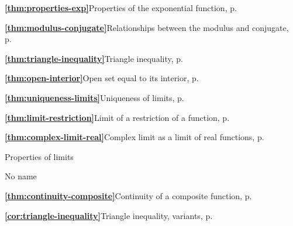 \textbf{\ref{thm:properties-exp}}\quad Properties of the exponential function, p.~\pageref{thm:properties-exp}

\textbf{\ref{thm:modulus-conjugate}}\quad Relationships between the modulus and conjugate, p.~\pageref{thm:modulus-conjugate}

\textbf{\ref{thm:triangle-inequality}}\quad Triangle inequality, p.~\pageref{thm:triangle-inequality}

\textbf{\ref{thm:open-interior}}\quad Open set equal to its interior, p.~\pageref{thm:open-interior}

\textbf{\ref{thm:uniqueness-limits}}\quad Uniqueness of limits, p.~\pageref{thm:uniqueness-limits}

\textbf{\ref{thm:limit-restriction}}\quad Limit of a restriction of a function, p.~\pageref{thm:limit-restriction}

\textbf{\ref{thm:complex-limit-real}}\quad Complex limit as a limit of real functions, p.~\pageref{thm:complex-limit-real}

Properties of limits

No name

\textbf{\ref{thm:continuity-composite}}\quad Continuity of a composite function, p.~\pageref{thm:continuity-composite}

\textbf{\ref{cor:triangle-inequality}}\quad Triangle inequality, variants, p.~\pageref{cor:triangle-inequality}

